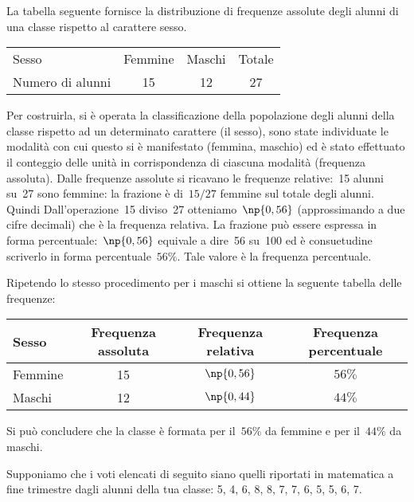 \begin{exrig}
 \begin{esempio}

La tabella seguente fornisce la distribuzione di frequenze assolute degli alunni di una classe rispetto al carattere sesso.

\begin{center}
\begin{tabular}{lccc}
\toprule
Sesso &Femmine &Maschi &Totale \\
Numero di alunni & 15 & 12 & 27 \\
\bottomrule
\end{tabular}
\end{center}

Per costruirla, si è operata la classificazione della popolazione degli alunni della classe rispetto ad un determinato carattere (il sesso),
sono state individuate le modalità con cui questo si è manifestato (femmina, maschio) ed è stato effettuato il conteggio delle unità
in corrispondenza di ciascuna modalità (frequenza assoluta).
Dalle frequenze assolute si ricavano le frequenze relative:~15 alunni su~27 sono femmine: la frazione è di~$15/27$ femmine sul totale degli alunni. Quindi Dall'operazione~15
diviso~27 otteniamo~$\np{0,56}$ (approssimando a due cifre decimali) che è la frequenza relativa.
La frazione può essere espressa in forma percentuale:~$\np{0,56}$ equivale a dire~56 su~100 ed è consuetudine scriverlo in forma percentuale~$56\%$. Tale valore è la frequenza percentuale.

Ripetendo lo stesso procedimento per i maschi si ottiene la seguente tabella delle frequenze:

\begin{center}
\begin{tabular}{lccc}
\toprule
Sesso & Frequenza assoluta & Frequenza relativa & Frequenza percentuale \\
\midrule
Femmine & 15 & $\np{0,56}$ & $56\%$ \\
Maschi & 12 & $\np{0,44}$ & $44\%$ \\
\bottomrule
\end{tabular}
\end{center}
Si può concludere che la classe è formata per il~$56\%$ da femmine e per il~$44\%$ da maschi.
 \end{esempio}

 \begin{esempio}

Supponiamo che i voti elencati di seguito siano quelli riportati in matematica a fine trimestre
dagli alunni della tua classe: 5, 4, 6, 8, 8, 7, 7, 6, 5, 5, 6, 7.


\end{esempio}
\end{exrig}
